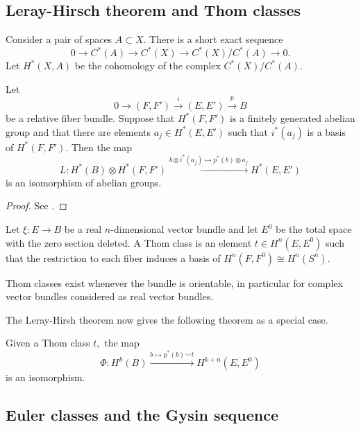 \documentclass[a4paper,openany]{scrbook}
\begin{document}
\subsection{Leray-Hirsch theorem and Thom classes}

\begin{defn}
Consider a pair of spaces $A\subset X.$ There is a short exact sequence $$0\rightarrow C^*(A)\rightarrow C^*(X)\rightarrow C^*(X)/C^*(A)\rightarrow 0.$$ Let $H^*(X,A)$ be the cohomology of the complex $C^*(X)/C^*(A).$ 
\end{defn}

\begin{thm}
Let $$0\rightarrow (F,F')\xrightarrow{i} (E,E') \xrightarrow{p} B $$ be a relative fiber bundle. Suppose that $H^*(F,F')$ is a finitely generated abelian group and that there are elements $a_j\in H^*(E,E')$ such that $i^*(a_j)$ is a basis of $H^*(F,F').$ Then the map $$L:H^*(B)\otimes H^*(F,F')\xrightarrow{b\otimes i^*(a_j)\mapsto p^*(b)\otimes a_j}H^*(E,E')$$ is an isomorphism of abelian groups.
\end{thm}

\begin{proof}
See \cite[Theorem 17.8.1]{tomdieck:algebraic-topology}.
\end{proof}

\begin{defn}
Let $\xi:E\rightarrow B$ be a real $n$-dimensional vector bundle and let $E^0$ be the total space with the zero section deleted. A Thom class is an element $t\in H^n(E,E^0)$ such that the restriction to each fiber induces a basis of $H^n(F,F^0)\cong H^n(S^n).$
\end{defn}

\begin{remark}
Thom classes exist whenever the bundle is orientable, in particular for complex vector bundles considered as real vector bundles.
\end{remark}

The Leray-Hirsh theorem now gives the following theorem as a special case.

\begin{thm}
Given a Thom class $t,$ the map $$\Phi:H^k(B)\xrightarrow{b \mapsto p^*(b)\smile t} H^{k+n}(E,E^0)$$ is an isomorphism.
\end{thm}

\subsection{Euler classes and the Gysin sequence}
\end{document}

